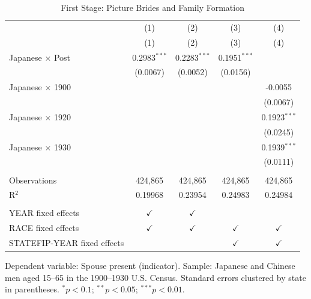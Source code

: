 \begin{table}[htbp]
   \caption{\label{tab:first_stage} First Stage: Picture Brides and Family Formation}
   \bigskip
   \centering
   \begin{tabular}{lcccc}
      \toprule
                                  & (1)            & (2)            & (3)            & (4) \\   
                                  & (1)            & (2)            & (3)            & (4)\\  
      \midrule 
      Japanese $\times$ Post      & 0.2983$^{***}$ & 0.2283$^{***}$ & 0.1951$^{***}$ &   \\   
                                  & (0.0067)       & (0.0052)       & (0.0156)       &   \\   
      Japanese $\times$ 1900      &                &                &                & -0.0055\\   
                                  &                &                &                & (0.0067)\\   
      Japanese $\times$ 1920      &                &                &                & 0.1923$^{***}$\\   
                                  &                &                &                & (0.0245)\\   
      Japanese $\times$ 1930      &                &                &                & 0.1939$^{***}$\\   
                                  &                &                &                & (0.0111)\\   
       \\
      Observations                & 424,865        & 424,865        & 424,865        & 424,865\\  
      R$^2$                       & 0.19968        & 0.23954        & 0.24983        & 0.24984\\  
       \\
      YEAR fixed effects          & $\checkmark$   & $\checkmark$   &                & \\  
      RACE fixed effects          & $\checkmark$   & $\checkmark$   & $\checkmark$   & $\checkmark$\\   
      STATEFIP-YEAR fixed effects &                &                & $\checkmark$   & $\checkmark$\\   
      \bottomrule
   \end{tabular}
   
   \par \raggedright 
   Dependent variable: Spouse present (indicator). Sample: Japanese and Chinese men aged 15--65 in the 1900--1930 U.S. Census. Standard errors clustered by state in parentheses. $^{*}p<0.1$; $^{**}p<0.05$; $^{***}p<0.01$.
\end{table}
